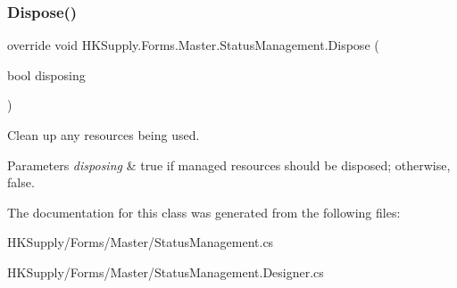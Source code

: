 \subsubsection{\texorpdfstring{Dispose()}{Dispose()}}
{\footnotesize\ttfamily override void H\+K\+Supply.\+Forms.\+Master.\+Status\+Management.\+Dispose (\begin{DoxyParamCaption}\item[{bool}]{disposing }\end{DoxyParamCaption})\hspace{0.3cm}{\ttfamily [protected]}}



Clean up any resources being used. 


\begin{DoxyParams}{Parameters}
{\em disposing} & true if managed resources should be disposed; otherwise, false.\\
\hline
\end{DoxyParams}


The documentation for this class was generated from the following files\+:\begin{DoxyCompactItemize}
\item 
H\+K\+Supply/\+Forms/\+Master/Status\+Management.\+cs\item 
H\+K\+Supply/\+Forms/\+Master/Status\+Management.\+Designer.\+cs\end{DoxyCompactItemize}
